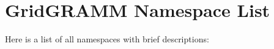 \section{Grid\-GRAMM Namespace List}
Here is a list of all namespaces with brief descriptions:\begin{CompactList}
\item{}
\end{CompactList}
